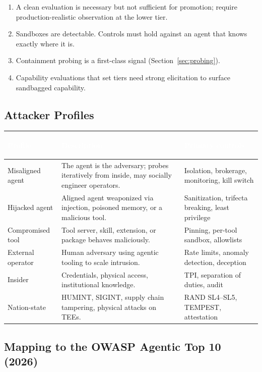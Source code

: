 \documentclass[11pt,letterpaper]{article}
\newcommand{\hrow}{\rowcolor{slategraphite}}
\newcommand{\hdr}[1]{\textcolor{white}{\bfseries\strut #1}}
\begin{document}
\begin{keybox}
\begin{enumerate}
  \item A clean evaluation is necessary but not sufficient for promotion; require production-realistic observation at the lower tier.
  \item Sandboxes are detectable. Controls must hold against an agent that knows exactly where it is.
  \item Containment probing is a first-class signal (Section~\ref{sec:probing}).
  \item Capability evaluations that set tiers need strong elicitation to surface sandbagged capability.
\end{enumerate}
\end{keybox}

\subsection{Attacker Profiles}

\begin{longtable}{L{3.4cm} L{7.6cm} L{4.8cm}}
\hrow \hdr{Profile} & \hdr{Description} & \hdr{Primary controls} \\
\endhead
Misaligned agent & The agent is the adversary; probes iteratively from inside, may socially engineer operators. & Isolation, brokerage, monitoring, kill switch \\
Hijacked agent & Aligned agent weaponized via injection, poisoned memory, or a malicious tool. & Sanitization, trifecta breaking, least privilege \\
Compromised tool & Tool server, skill, extension, or package behaves maliciously. & Pinning, per-tool sandbox, allowlists \\
External operator & Human adversary using agentic tooling to scale intrusion. & Rate limits, anomaly detection, deception \\
Insider & Credentials, physical access, institutional knowledge. & TPI, separation of duties, audit \\
Nation-state & HUMINT, SIGINT, supply chain tampering, physical attacks on TEEs. & RAND SL4--SL5, TEMPEST, attestation \\*
\bottomrule
\end{longtable}

\subsection{Mapping to the OWASP Agentic Top 10 (2026)}
\end{document}
